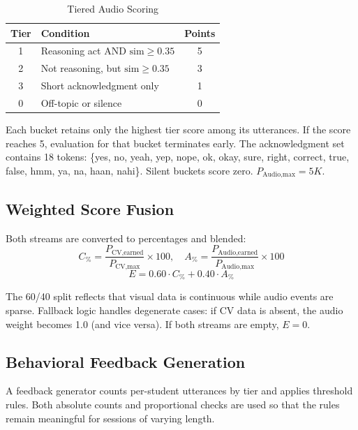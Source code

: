 \documentclass[conference]{IEEEtran}
\begin{document}
\begin{table}[htbp]
\caption{Tiered Audio Scoring}
\begin{center}
\begin{tabular}{|c|p{3.4cm}|c|}
\hline
\textbf{Tier} & \textbf{Condition} & \textbf{Points} \\
\hline
1 & Reasoning act AND $\text{sim} \geq 0.35$ & 5 \\
\hline
2 & Not reasoning, but $\text{sim} \geq 0.35$ & 3 \\
\hline
3 & Short acknowledgment only & 1 \\
\hline
0 & Off-topic or silence & 0 \\
\hline
\end{tabular}
\label{tab:tiers}
\end{center}
\end{table}

Each bucket retains only the highest tier score among its utterances. If the score reaches 5, evaluation for that bucket terminates early. The acknowledgment set contains 18 tokens: \{yes, no, yeah, yep, nope, ok, okay, sure, right, correct, true, false, hmm, ya, na, haan, nahi\}. Silent buckets score zero. $P_{\text{Audio,max}} = 5K$.

\subsection{Weighted Score Fusion}
Both streams are converted to percentages and blended:
\begin{equation}
C_{\%} = \frac{P_{\text{CV,earned}}}{P_{\text{CV,max}}} \times 100, \quad
A_{\%} = \frac{P_{\text{Audio,earned}}}{P_{\text{Audio,max}}} \times 100
\label{eq:pct}
\end{equation}
\begin{equation}
E = 0.60 \cdot C_{\%} + 0.40 \cdot A_{\%}
\label{eq:blend}
\end{equation}

The 60/40 split reflects that visual data is continuous while audio events are sparse. Fallback logic handles degenerate cases: if CV data is absent, the audio weight becomes 1.0 (and vice versa). If both streams are empty, $E = 0$.

\subsection{Behavioral Feedback Generation}
A feedback generator counts per-student utterances by tier and applies threshold rules. Both absolute counts and proportional checks are used so that the rules remain meaningful for sessions of varying length.
\end{document}
